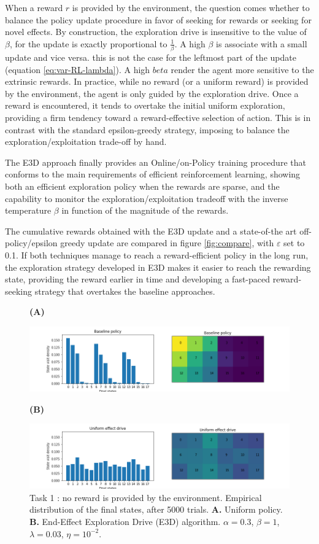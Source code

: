 \documentclass[runningheads]{llncs}
\begin{document}
When a reward $r$ is provided by the environment, the question comes whether to balance the policy update procedure in favor of seeking for rewards or seeking for novel effects. By construction, the exploration drive is insensitive to the value of $\beta$, for the update is exactly proportional to $\frac{1}{\beta}$.  A high $\beta$ is associate with a small update and vice versa. this is not the case for the leftmost part of the update (equation \ref{eq:var-RL-lambda}). A high $beta$ render the agent more sensitive to the extrinsic rewards. In practice, while no reward (or a uniform reward) is provided by the environment, the agent is only guided by the exploration drive. Once a reward is encountered, it tends to overtake the initial uniform exploration, providing a firm tendency toward a reward-effective selection of action. This is in contrast with the standard epsilon-greedy strategy, imposing to balance the exploration/exploitation trade-off by hand.

The E3D approach finally provides an Online/on-Policy training procedure that conforms to the main requirements of efficient reinforcement learning, showing both an efficient exploration policy when the rewards are sparse, and the capability to monitor the exploration/exploitation tradeoff with the inverse temperature $\beta$ in function of the magnitude of the rewards.

The cumulative rewards obtained with the E3D update and a state-of-the art off-policy/epsilon greedy update are compared in figure \ref{fig:compare}, with $\varepsilon$ set to 0.1. If both techniques manage to reach a reward-efficient policy in the long run, the exploration strategy developed in E3D makes it easier to reach the rewarding state, providing the reward earlier in time and developing a fast-paced reward-seeking strategy that overtakes the baseline approaches.    

\begin{figure}[t!]\label{fig:explore}
	\centerline{\bf (A)}
	\centerline{
		\includegraphics[width = .9\linewidth]{../figures/botteneck-baseline.png} 		
	}
	\centerline{\bf (B)}
	\centerline{\includegraphics[width = .9\linewidth]{../figures/botteneck-uniform-drive.png} }
	\caption{Task 1 : no reward is provided by the environment. Empirical distribution of the final states, after 5000 trials. {\bf A.} Uniform policy. {\bf B.} End-Effect Exploration Drive (E3D) algorithm. $\alpha=0.3$, $\beta = 1$, $\lambda=0.03$, $\eta=10^{-2}$.}
\end{figure}
\end{document}
